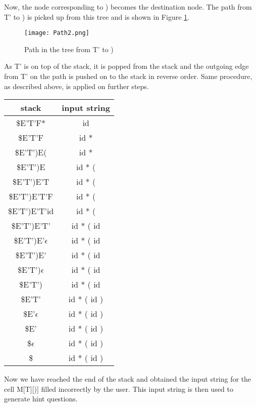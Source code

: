 \begin{example}
Now, the node corresponding to ) becomes the destination node. The path from T' to ) is picked up from this tree and is shown in Figure \ref{fig:Path 2}.
\begin{figure}
\centering
\texttt{[image: Path2.png]}
\caption{Path in the tree from T' to )}
\label{fig:Path 2}
\end{figure}

As T' is on top of the stack, it is popped from the stack and the outgoing edge from T' on the path is pushed on to the stack in reverse order. Same procedure, as described above, is applied on further steps.
\begin{center}
\begin{tabular}{ |c|c| } 
 \hline
 \textbf{stack} & \textbf{input string} \\
 \hline
 \$E'T'F* & id \\
 \$E'T'F & id * \\
 \$E'T')E( & id * \\
 \$E'T')E &	id * ( \\
 \$E'T')E'T & id * ( \\
 \$E'T')E'T'F &	id * ( \\
 \$E'T')E'T'id & id * ( \\
 \$E'T')E'T' & id * ( id \\
 \$E'T')E'$\epsilon$ & id * ( id \\
 \$E'T')E' & id * ( id \\
 \$E'T')$\epsilon$ & id * ( id \\
 \$E'T') & id * ( id \\
 \$E'T' & id * ( id ) \\
 \$E'$\epsilon$ & id * ( id ) \\
 \$E' & id * ( id ) \\
 \$$\epsilon$ & id * ( id ) \\
 \$ & id * ( id ) \\
 \hline
\end{tabular}
\end{center}

Now we have reached the end of the stack and obtained the input string for the cell M[T][)] filled incorrectly by the user. This input string is then used to generate hint questions.

\end{example}

